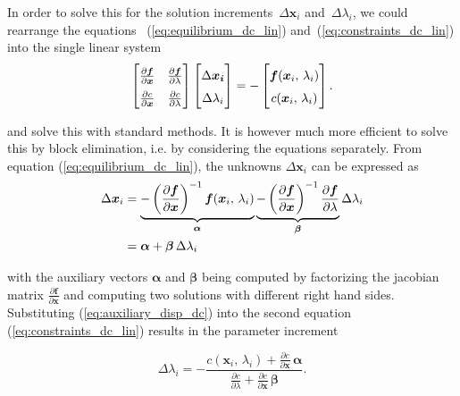 In order to solve this for the solution increments~$\Delta\boldsymbol{x}_{i}$ and~$\Delta\lambda_{i}$, we could rearrange the equations ~(\ref{eq:equilibrium_dc_lin}) and~(\ref{eq:constraints_dc_lin}) into the single linear system
%
\begin{align}
\renewcommand{\arraystretch}{1.5}
\begin{bmatrix}
\frac{\partial\boldsymbol{f}}{\partial\boldsymbol{x}} & \frac{\partial\boldsymbol{f}}{\partial\lambda} \\
\frac{\partial c}{\partial\boldsymbol{x}} & \frac{\partial c}{\partial\lambda}
\end{bmatrix}
\begin{bmatrix}
\Delta\boldsymbol{x_{i}}\\
\Delta\lambda_{i}
\end{bmatrix}
=
-
\begin{bmatrix}
\boldsymbol{f}(\boldsymbol{x}_{i},\,\lambda_{i}) \\
c(\boldsymbol{x}_{i},\,\lambda_{i})
\end{bmatrix}.\label{eq:total_dc_lin}
\end{align}

and solve this with standard methods.
It is however much more efficient to solve this by block elimination, i.e. by considering the equations separately.
From equation (\ref{eq:equilibrium_dc_lin}), the unknowns $\Delta\boldsymbol{x}_{i}$ can be expressed as
%
\begin{align}
\Delta\boldsymbol{x}_{i} &= \underbrace{-\left(\frac{\partial\boldsymbol{f}}{\partial\boldsymbol{x}}\right)^{-1}\boldsymbol{f}(\boldsymbol{x}_{i},\,\lambda_{i})}_{\boldsymbol{\alpha}} \underbrace{- \left(\frac{\partial\boldsymbol{f}}{\partial\boldsymbol{x}}\right)^{-1}\frac{\partial\boldsymbol{f}}{\partial\lambda}}_{\boldsymbol{\beta}}\Delta\lambda_{i} \notag \\
&= \boldsymbol{\alpha} + \boldsymbol{\beta}\,\Delta\lambda_{i} \label{eq:auxiliary_disp_dc}
\end{align}

with the auxiliary vectors $\boldsymbol{\alpha}$ and $\boldsymbol{\beta}$ being computed by factorizing the jacobian matrix $\frac{\partial\boldsymbol{f}}{\partial\boldsymbol{x}}$ and computing two solutions with different right hand sides.
Substituting (\ref{eq:auxiliary_disp_dc}) into the second equation (\ref{eq:constraints_dc_lin}) results in the parameter increment

\begin{equation}
\Delta\lambda_{i} = -\frac{c(\boldsymbol{x}_{i},\,\lambda_{i}) + \frac{\partial c}{\partial\boldsymbol{x}}\,\boldsymbol{\alpha}}{\frac{\partial c}{\partial\lambda} + \frac{\partial c}{\partial\boldsymbol{x}}\,\boldsymbol{\beta}}.\label{eq:res_load_factor}
\end{equation}

